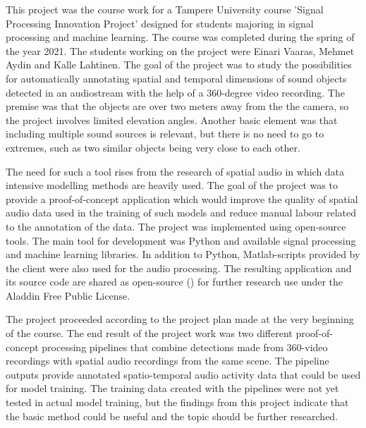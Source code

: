 This project was the course work for a Tampere University course 'Signal Processing Innovation Project' designed for students majoring in signal processing and machine learning. The course was completed during the spring of the year 2021. The students working on the project were Einari Vaaras, Mehmet Aydin and Kalle Lahtinen. The goal of the project was to study the possibilities for automatically annotating spatial and temporal dimensions of sound objects detected in an audiostream with the help of a 360-degree video recording. The premise was that the objects are over two meters away from the the camera, so the project involves limited elevation angles. Another basic element was that including multiple sound sources is relevant, but there is no need to go to extremes, such as two similar objects being very close to each other.

The need for such a tool rises from the research of spatial audio in which data intensive modelling methods are heavily used. The goal of the project was to provide a proof-of-concept application which would improve the quality of spatial audio data used in the training of such models and reduce manual labour related to the annotation of the data. The project was implemented using open-source tools. The main tool for development was Python and available signal processing and machine learning libraries. In addition to Python, Matlab-scripts provided by the client were also used for the audio processing. The resulting application and its source code are shared as open-source () for further research use under the Aladdin Free Public License.

The project proceeded according to the project plan made at the very beginning of the course. The end result of the project work was two different proof-of-concept processing pipelines that combine detections made from 360-video recordings with spatial audio recordings from the same scene. The pipeline outputs provide annotated spatio-temporal audio activity data that could be used for model training. The training data created with the pipelines were not yet tested in actual model training, but the findings from this project indicate that the basic method could be useful and the topic should be further researched.  